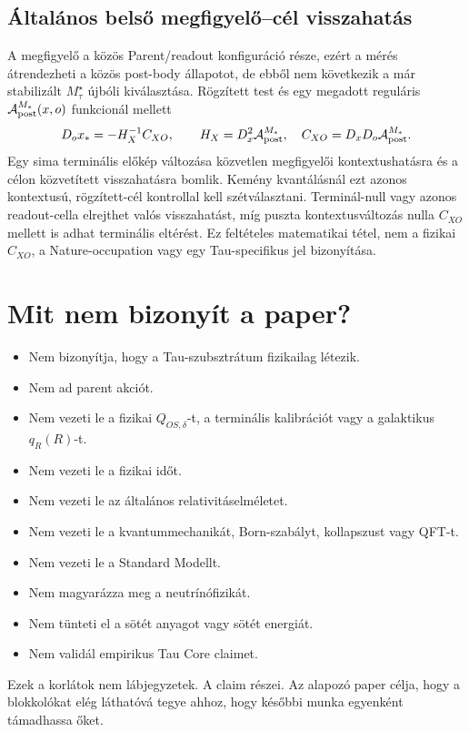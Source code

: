 \documentclass[12pt]{article}
\begin{document}
\subsection*{Általános belső megfigyelő--cél visszahatás}

A megfigyelő a közös Parent/readout konfiguráció része, ezért a mérés
átrendezheti a közös post-body állapotot, de ebből nem következik a már
stabilizált \(M_\tau^\star\) újbóli kiválasztása. Rögzített test és egy
megadott reguláris \(\mathcal A_{\rm post}^{M_*}(x,o)\) funkcionál mellett
\[
 D_ox_*=-H_X^{-1}C_{XO},\qquad
 H_X=D_x^2\mathcal A_{\rm post}^{M_*},\quad
 C_{XO}=D_xD_o\mathcal A_{\rm post}^{M_*}.
\]
Egy sima terminális előkép változása közvetlen megfigyelői
kontextushatásra és a célon közvetített visszahatásra bomlik. Kemény
kvantálásnál ezt azonos kontextusú, rögzített-cél kontrollal kell szétválasztani.
Terminál-null vagy azonos readout-cella elrejthet valós visszahatást, míg
puszta kontextusváltozás nulla \(C_{XO}\) mellett is adhat terminális eltérést.
Ez feltételes matematikai tétel, nem a fizikai \(C_{XO}\), a Nature-occupation
vagy egy Tau-specifikus jel bizonyítása.

\section{Mit nem bizonyít a paper?}

\begin{itemize}
  \item Nem bizonyítja, hogy a Tau-szubsztrátum fizikailag létezik.
  \item Nem ad parent akciót.
  \item Nem vezeti le a fizikai \(Q_{OS,\delta}\)-t, a terminális
  kalibrációt vagy a galaktikus \(q_R(R)\)-t.
  \item Nem vezeti le a fizikai időt.
  \item Nem vezeti le az általános relativitáselméletet.
  \item Nem vezeti le a kvantummechanikát, Born-szabályt, kollapszust vagy QFT-t.
  \item Nem vezeti le a Standard Modellt.
  \item Nem magyarázza meg a neutrínófizikát.
  \item Nem tünteti el a sötét anyagot vagy sötét energiát.
  \item Nem validál empirikus Tau Core claimet.
\end{itemize}

Ezek a korlátok nem lábjegyzetek.  A claim részei.  Az alapozó paper célja,
hogy a blokkolókat elég láthatóvá tegye ahhoz, hogy későbbi munka egyenként
támadhassa őket.
\end{document}

